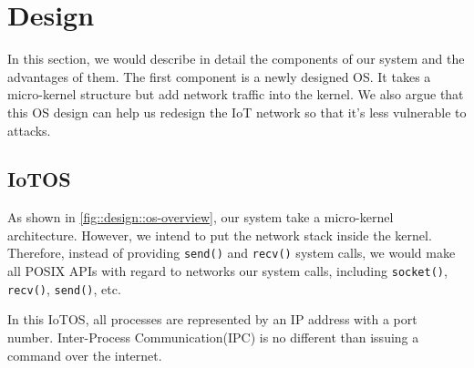 \section{Design}

In this section, we would describe in detail the components of our system and the advantages of them.
The first component is a newly designed OS. 
It takes a micro-kernel structure but add network traffic into the kernel.
We also argue that this OS design can help us redesign the IoT network so that it's less vulnerable to attacks.

\subsection{IoTOS}

As shown in \autoref{fig::design::os-overview}, our system take a micro-kernel architecture.
However, we intend to put the network stack inside the kernel.
Therefore, instead of providing \texttt{send()} and \texttt{recv()} system calls, we would make all POSIX APIs with regard to networks our system calls, including \texttt{socket()}, \texttt{recv()}, \texttt{send()}, etc.

In this IoTOS, all processes are represented by an IP address with a port number. Inter-Process Communication(IPC) is no different than issuing a command over the internet.

